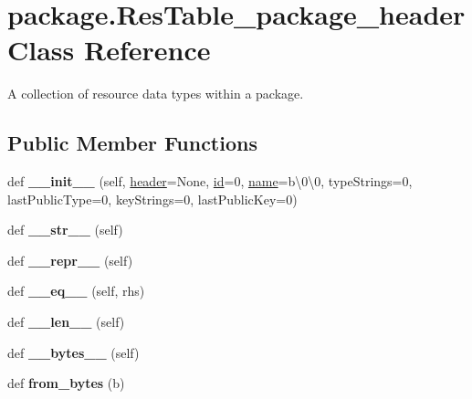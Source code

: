 \hypertarget{classpackage_1_1ResTable__package__header}{}\section{package.\+Res\+Table\+\_\+package\+\_\+header Class Reference}
\label{classpackage_1_1ResTable__package__header}


A collection of resource data types within a package.  


\subsection*{Public Member Functions}
\begin{DoxyCompactItemize}
\item 
\mbox{\label{classpackage_1_1ResTable__package__header_a413336c1014da8a3781eda8a2542469c}} 
def {\bfseries \+\_\+\+\_\+init\+\_\+\+\_\+} (self, \mbox{\hyperlink{classpackage_1_1ResTable__package__header_a6de11850cfa30e936ae7b0c6b0c852c2}{header}}=None, \mbox{\hyperlink{classpackage_1_1ResTable__package__header_a2726e7fc9dac06c2ff225fbab0a896d2}{id}}=0, \mbox{\hyperlink{classpackage_1_1ResTable__package__header_a343dde2c971c41ce8362aedf4d87118f}{name}}=b\textquotesingle{}\textbackslash{}0\textbackslash{}0\textquotesingle{}, type\+Strings=0, last\+Public\+Type=0, key\+Strings=0, last\+Public\+Key=0)
\item 
\mbox{\label{classpackage_1_1ResTable__package__header_a6037edf9c84bd0418ecf9f5906ebe6ee}} 
def {\bfseries \+\_\+\+\_\+str\+\_\+\+\_\+} (self)
\item 
\mbox{\label{classpackage_1_1ResTable__package__header_ab87e996da0df4ec3d77d2409762a14b7}} 
def {\bfseries \+\_\+\+\_\+repr\+\_\+\+\_\+} (self)
\item 
\mbox{\label{classpackage_1_1ResTable__package__header_a2ba63550619901bd1f2cecbe426d1e87}} 
def {\bfseries \+\_\+\+\_\+eq\+\_\+\+\_\+} (self, rhs)
\item 
\mbox{\label{classpackage_1_1ResTable__package__header_ae142863c7e98a2425805bfc6dc7e2e10}} 
def {\bfseries \+\_\+\+\_\+len\+\_\+\+\_\+} (self)
\item 
\mbox{\label{classpackage_1_1ResTable__package__header_a79756e7a1bbfa5a7791ea09f3082786e}} 
def {\bfseries \+\_\+\+\_\+bytes\+\_\+\+\_\+} (self)
\item 
\mbox{\label{classpackage_1_1ResTable__package__header_ab64a8a30a3db0c71fef3eb5b8867a0c3}} 
def {\bfseries from\+\_\+bytes} (b)
\end{DoxyCompactItemize}
